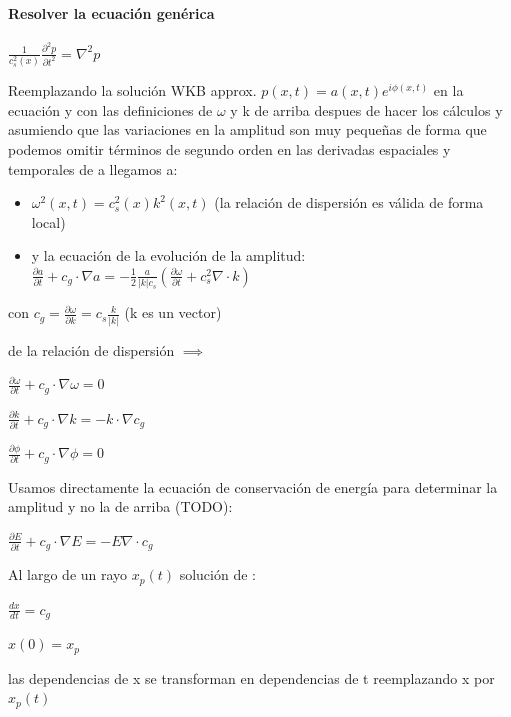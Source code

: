 \documentclass{article}
\begin{document}
\paragraph{Resolver la ecuación genérica}
\begin{description}  
\item $\frac{1}{c_s^{2}(x)} \frac{\partial^{2} p}{\partial t^{2}} = \nabla^{2} p  $
\item Reemplazando la solución WKB approx. $p(x,t) = a(x,t) e^{i \phi(x,t)}$ en la ecuación y con las definiciones de $\omega$ y k de arriba despues 
de hacer los cálculos 
y asumiendo  que las variaciones en la amplitud son muy pequeñas de forma que podemos omitir términos de segundo orden en las derivadas espaciales y temporales de a llegamos a: 
\begin{itemize}
\item $\omega^{2}(x,t) = c_s^{2}(x) k^2(x,t)$ (la relación de dispersión es válida de forma local)
\item y la ecuación de la evolución de la amplitud:
  $\frac{\partial a}{\partial t} + c_g \cdot \nabla a = -\frac{1}{2} \frac{a}{|k| c_s} (\frac{\partial \omega}{\partial t} + c_s^{2}  \nabla \cdot k) $
\end{itemize}
\item con $c_g = \frac{\partial \omega}{\partial k} = c_s \frac{k}{|k|}$ (k es un vector)  

\item de la relación de dispersión $\implies $ 
\item$\frac{\partial \omega}{\partial t} + c_g \cdot \nabla \omega = 0 $
\item$\frac{\partial k}{\partial t} + c_g \cdot \nabla k = -k \cdot \nabla  c_g $
\item$\frac{\partial \phi}{\partial t} + c_g \cdot \nabla \phi = 0 $

\item Usamos directamente la ecuación de conservación de energía para determinar la amplitud y no la de arriba (TODO):
\item$\frac{\partial E}{\partial t} + c_g \cdot \nabla E = -E \nabla \cdot c_g $

\end{description}


Al largo de un rayo  $x_p(t)$ solución de :

\begin{description}  
\item$\frac{dx}{dt} = c_g $
\item$ x(0) = x_p $
\end{description}
las dependencias de x se transforman en dependencias de t reemplazando x por $x_p(t) $ 
\end{document}
